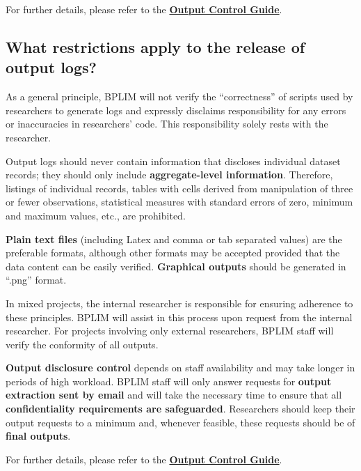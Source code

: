 \documentclass[
  a4paper,
  DIV=11,
  numbers=noendperiod]{scrartcl}
\begin{document}
For further details, please refer to the
\href{https://github.com/BPLIM/Manuals/blob/master/Guides/06_Output_Control}{\textbf{Output
Control Guide}}.

\hypertarget{what-restrictions-apply-to-the-release-of-output-logs}{%
\subsection{What restrictions apply to the release of output
logs?}\label{what-restrictions-apply-to-the-release-of-output-logs}}

As a general principle, BPLIM will not verify the ``correctness'' of
scripts used by researchers to generate logs and expressly disclaims
responsibility for any errors or inaccuracies in researchers' code. This
responsibility solely rests with the researcher.

Output logs should never contain information that discloses individual
dataset records; they should only include \textbf{aggregate-level
information}. Therefore, listings of individual records, tables with
cells derived from manipulation of three or fewer observations,
statistical measures with standard errors of zero, minimum and maximum
values, etc., are prohibited.

\textbf{Plain text files} (including Latex and comma or tab separated
values) are the preferable formats, although other formats may be
accepted provided that the data content can be easily verified.
\textbf{Graphical outputs} should be generated in ``.png'' format.

In mixed projects, the internal researcher is responsible for ensuring
adherence to these principles. BPLIM will assist in this process upon
request from the internal researcher. For projects involving only
external researchers, BPLIM staff will verify the conformity of all
outputs.

\textbf{Output disclosure control} depends on staff availability and may
take longer in periods of high workload. BPLIM staff will only answer
requests for \textbf{output extraction sent by email} and will take the
necessary time to ensure that all \textbf{confidentiality requirements
are safeguarded}. Researchers should keep their output requests to a
minimum and, whenever feasible, these requests should be of
\textbf{final outputs}.

For further details, please refer to the
\href{https://github.com/BPLIM/Manuals/blob/master/Guides/06_Output_Control}{\textbf{Output
Control Guide}}.
\end{document}
